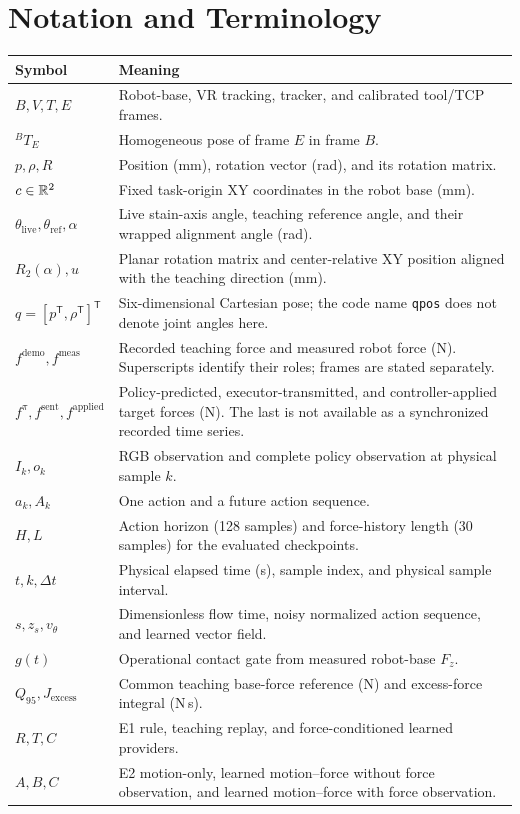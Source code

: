 \chapter*{Notation and Terminology}
\begin{longtable}{P{0.23\textwidth}p{0.69\textwidth}}
\toprule Symbol & Meaning \\ \midrule
\endhead
\(B,V,T,E\) & Robot-base, VR tracking, tracker, and calibrated tool/TCP frames. \\
\({}^{B}T_E\) & Homogeneous pose of frame \(E\) in frame \(B\). \\
\(p,\rho,R\) & Position (mm), rotation vector (rad), and its rotation matrix. \\
\(c\in\mathbb{R}^2\) & Fixed task-origin XY coordinates in the robot base (mm). \\
\(\theta_{\mathrm{live}},\theta_{\mathrm{ref}},\alpha\) & Live stain-axis angle, teaching reference angle, and their wrapped alignment angle (rad). \\
\(R_2(\alpha),u\) & Planar rotation matrix and center-relative XY position aligned with the teaching direction (mm). \\
\(q=[p^\mathsf{T},\rho^\mathsf{T}]^\mathsf{T}\) & Six-dimensional Cartesian pose; the code name \texttt{qpos} does not denote joint angles here. \\
\(f^{\mathrm{demo}},f^{\mathrm{meas}}\) & Recorded teaching force and measured robot force (N). Superscripts identify their roles; frames are stated separately. \\
\(f^{\pi},f^{\mathrm{sent}},f^{\mathrm{applied}}\) & Policy-predicted, executor-transmitted, and controller-applied target forces (N). The last is not available as a synchronized recorded time series. \\
\(I_k,o_k\) & RGB observation and complete policy observation at physical sample \(k\). \\
\(a_k,A_k\) & One action and a future action sequence. \\
\(H,L\) & Action horizon (128 samples) and force-history length (30 samples) for the evaluated checkpoints. \\
\(t,k,\Delta t\) & Physical elapsed time (s), sample index, and physical sample interval. \\
\(s,z_s,v_\theta\) & Dimensionless flow time, noisy normalized action sequence, and learned vector field. \\
\(g(t)\) & Operational contact gate from measured robot-base \(F_z\). \\
\(Q_{95},J_{\mathrm{excess}}\) & Common teaching base-force reference (N) and excess-force integral (N\,s). \\
\(R,T,C\) & E1 rule, teaching replay, and force-conditioned learned providers. \\
\(A,B,C\) & E2 motion-only, learned motion--force without force observation, and learned motion--force with force observation. \\
\bottomrule
\end{longtable}

